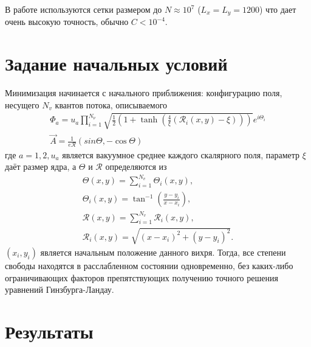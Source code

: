 В работе используются сетки размером до \( N \approx 10^7 \) 
(\( L_x = L_y = 1200 \)) что дает очень высокую точность, обычно 
\( C < 10^{-4} \). \cite{bib:minimization}

\section{Задание начальных условий}

Минимизация начинается с начального приближения: конфигурацию поля, несущего
\( N_v \) квантов потока, описываемого
\begin{gather}
    \Phi_a = u_a \prod\limits_{i=1}^{N_\nu} \sqrt{ 
        \frac{1}{2}\left( 1 + \tanh\left( 
            \frac{4}{\xi}\left( \mathcal{R}_i(x,y) - \xi \right)
        \right) \right)
    } e^{i\Theta_i}
    \nonumber \\
    \vec{A} = \frac{1}{e\mathcal{R}}\left( sin\Theta, -\cos\Theta \right)
    \label{eqm:6}
\end{gather}
где \( a = 1,2, u_a \) является вакуумное среднее каждого скалярного поля, 
параметр \( \xi \) даёт размер ядра, а \( \Theta \) и
\( \mathcal{R} \) определяются из
\begin{gather}
    \Theta(x,y) = \sum\limits_{i=1}^{N_v} \Theta_i(x,y), \nonumber \\
    \Theta_i(x,y) = \tan^{-1}\left(\frac{y-y_i}{x-x_i} \right), \nonumber \\
    \mathcal{R}(x,y) = \sum\limits_{i=1}^{N_v} \mathcal{R}_i(x,y), \nonumber \\
    \mathcal{R}_i(x,y) = \sqrt{(x-x_i)^2+(y-y_i)^2}.
\end{gather}
\( (x_i,y_i) \) является начальным положение данного вихря. Тогда, все степени 
свободы находятся в расслабленном состоянии одновременно, без каких-либо 
ограничивающих факторов препятствующих получению точного решения уравнений 
Гинзбурга-Ландау.
\cite{bib:minimization}

\section{Результаты}

\newpage